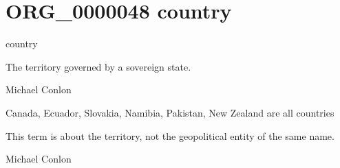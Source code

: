 \documentclass[letterpaper,10pt,english]{sphinxmanual}
\begin{document}
\section{ORG\_0000048 \sphinxhyphen{} country}
\label{\detokenize{doc-ORG_0000048:org-0000048-country}}\label{\detokenize{doc-ORG_0000048:index-0}}\label{\detokenize{doc-ORG_0000048::doc}}
\begin{sphinxShadowBox}

\sphinxAtStartPar
country
\end{sphinxShadowBox}

\begin{sphinxShadowBox}

\sphinxAtStartPar
The territory governed by a sovereign state.
\end{sphinxShadowBox}

\begin{sphinxShadowBox}

\sphinxAtStartPar
Michael Conlon 
\end{sphinxShadowBox}

\begin{sphinxShadowBox}

\sphinxAtStartPar
Canada, Ecuador, Slovakia, Namibia, Pakistan, New Zealand are all countries
\end{sphinxShadowBox}

\begin{sphinxShadowBox}

\sphinxAtStartPar
This term is about the territory, not the geopolitical entity of the same name.
\end{sphinxShadowBox}

\begin{sphinxShadowBox}

\sphinxAtStartPar
Michael Conlon 
\end{sphinxShadowBox}
\begin{quote}
\label{\detokenize{doc-ORG_0000049:org-0000049}}\label{\detokenize{doc-ORG_0000049:region}}\label{\detokenize{doc-ORG_0000049:org-0000049}}
\ignorespaces \end{quote}
\end{document}
